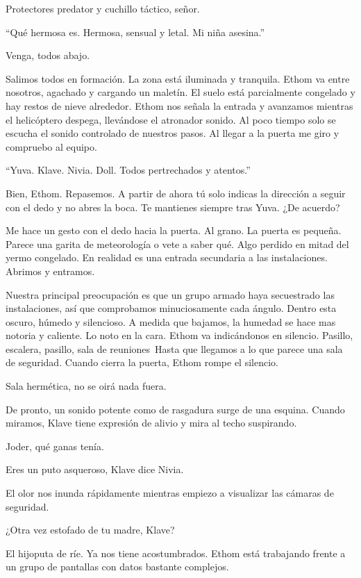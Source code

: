 \reply Protectores predator y cuchillo táctico, señor.

``Qué hermosa es. Hermosa, sensual y letal. Mi niña asesina.''

\reply Venga, todos abajo.

Salimos todos en formación. La zona está iluminada y tranquila. Ethom va entre nosotros, agachado y cargando un maletín. El suelo está parcialmente congelado y hay restos de nieve alrededor.
Ethom nos señala la entrada y avanzamos mientras el helicóptero despega, llevándose el atronador sonido. Al poco tiempo solo se escucha el sonido controlado de nuestros pasos. Al llegar a la puerta me giro y compruebo al equipo.

``Yuva. Klave. Nivia. Doll. Todos pertrechados y atentos.''

\reply Bien, Ethom. Repasemos. A partir de ahora tú solo indicas la dirección a seguir con el dedo y no abres la boca. Te mantienes siempre tras Yuva. ¿De acuerdo?

Me hace un gesto con el dedo hacia la puerta. Al grano. La puerta es pequeña. Parece una garita de meteorología o vete a saber qué. Algo perdido en mitad del yermo congelado. En realidad es una entrada secundaria a las instalaciones. Abrimos y entramos.

Nuestra principal preocupación es que un grupo armado haya secuestrado las instalaciones, así que comprobamos minuciosamente cada ángulo. Dentro esta oscuro, húmedo y silencioso. A medida que bajamos, la humedad se hace mas notoria y caliente. Lo noto en la cara. 
Ethom va indicándonos en silencio. Pasillo, escalera, pasillo, sala de reuniones\textellipsis\ Hasta que llegamos a lo que parece una sala de seguridad. Cuando cierra la puerta, Ethom rompe el silencio.

\reply Sala hermética, no se oirá nada fuera.

De pronto, un sonido potente como de rasgadura surge de una esquina. Cuando miramos, Klave tiene expresión de alivio y mira al techo suspirando.

\reply Joder, qué ganas tenía.

\reply Eres un puto asqueroso, Klave \pause dice Nivia.

El olor nos inunda rápidamente mientras empiezo a visualizar las cámaras de seguridad.

\reply ¿Otra vez estofado de tu madre, Klave?

El hijoputa de ríe. Ya nos tiene acostumbrados. Ethom está trabajando frente a un grupo de pantallas con datos bastante complejos.

